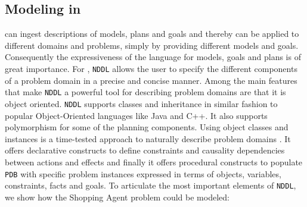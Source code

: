 \subsection{Modeling in \eu}
\label{sec:europa:modeling}

\eu can ingest descriptions of models, plans and goals and thereby can
be applied to different domains and problems, simply by providing
different models and goals. Consequently the expressiveness of the
language for models, goals and plans is of great importance. For \eue,
\texttt{NDDL} allows the user to specify the different components of a
problem domain in a precise and concise manner. Among the main
features that make \texttt{NDDL} a powerful tool for describing
problem domains are that it is object oriented. \texttt{NDDL} supports
classes and inheritance in similar fashion to popular Object-Oriented
languages like Java and C++. It also supports polymorphism for some of
the planning components. Using object classes and instances is a
time-tested approach to naturally describe problem domains
\cite{rumbaugh}. It offers declarative constructs to define
constraints and causality dependencies between actions and effects and
finally it offers procedural constructs to populate \eus \texttt{PDB}
with specific problem instances expressed in terms of objects,
variables, constraints, facts and goals. To articulate the most important
elements of \texttt{NDDL}, we show how the Shopping Agent problem
could be modeled:

